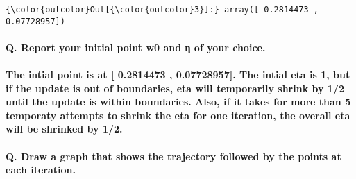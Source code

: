 \documentclass[11pt]{article}
\begin{document}
            \begin{Verbatim}[commandchars=\\\{\}]
{\color{outcolor}Out[{\color{outcolor}3}]:} array([ 0.2814473 ,  0.07728957])
\end{Verbatim}
        
    \paragraph{\texorpdfstring{{Q. Report your initial point w0 and η of
your
choice.}}{Q. Report your initial point w0 and η of your choice.}}\label{q.-report-your-initial-point-w0-and-ux3b7-of-your-choice.}

\paragraph{\texorpdfstring{{The intial point is at {[} 0.2814473 ,
0.07728957{]}. The intial eta is 1, but if the update is out of
boundaries, eta will temporarily shrink by 1/2 until the update is
within boundaries. Also, if it takes for more than 5 temporaty attempts
to shrink the eta for one iteration, the overall eta will be shrinked by
1/2.
}}{The intial point is at {[} 0.2814473 , 0.07728957{]}. The intial eta is 1, but if the update is out of boundaries, eta will temporarily shrink by 1/2 until the update is within boundaries. Also, if it takes for more than 5 temporaty attempts to shrink the eta for one iteration, the overall eta will be shrinked by 1/2. }}\label{the-intial-point-is-at-0.2814473-0.07728957.-the-intial-eta-is-1-but-if-the-update-is-out-of-boundaries-eta-will-temporarily-shrink-by-12-until-the-update-is-within-boundaries.-also-if-it-takes-for-more-than-5-temporaty-attempts-to-shrink-the-eta-for-one-iteration-the-overall-eta-will-be-shrinked-by-12.}

    \paragraph{\texorpdfstring{{Q. Draw a graph that shows the trajectory
followed by the points at each iteration.
}}{Q. Draw a graph that shows the trajectory followed by the points at each iteration. }}\label{q.-draw-a-graph-that-shows-the-trajectory-followed-by-the-points-at-each-iteration.}
\end{document}
